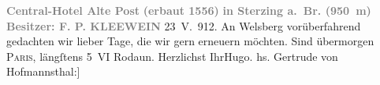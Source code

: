 \begin{ledgroupsized}[t]{13cm}
           \pstart
           \noindent{}\centering{}\textcolor{gray}{\textbf{{\pb}Central-Hotel Alte Post}}\pend
           \pstart
           \noindent{}\centering{}\textcolor{gray}{\textbf{(erbaut 1556)}}\pend
           \pstart
           \noindent{}\centering{}\textcolor{gray}{\textbf{in Sterzing a. Br.
                     (950 m)}}\pend
           \pstart
           \noindent{}\centering{}\textcolor{gray}{\textbf{Besitzer: F. P. KLEEWEIN}}\pend
           \pstart
           \raggedleft{}23 V. 912.\pend
           \pstart
           An Welsberg vorüberfahrend gedachten wir lieber
               Tage, die wir gern erneuern möchten. Sind übermorgen \textsc{Paris}, längſtens 5 VI{ }Rodaun.\pend
           \pstart Herzlichst Ihr\spacefill\mbox{Hugo.}\pend{}\pstart
           \noindent{}{[}hs. Gertrude von Hofmannsthal:{]} \label{T_L02070-1v}\label{T_L02070-1h}\pend
           
         
         \endnumbering{}\end{ledgroupsized}  \newcommand{\dateiname}{L02070}\newcommand{\titel}{Hugo und Gerty von Hofmannsthal an Arthur Schnitzler, 23. 5. 1912}\newcommand{\editorInnen}{Martin Anton Müller und Gerd-Hermann Susen}
      